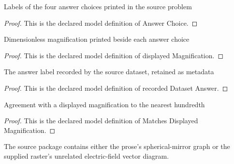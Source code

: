 \begin{definition}
  \label{def:physics:phyx-mini-0478:phyxminiproblems-problemphyxmini0478-answerchoice}
  Labels of the four answer choices printed in the source problem
\end{definition}
\begin{proof}
  This is the declared model definition of Answer Choice.
\end{proof}
\begin{definition}
  \label{def:physics:phyx-mini-0478:phyxminiproblems-problemphyxmini0478-displayedmagnification}
  Dimensionless magnification printed beside each answer choice
\end{definition}
\begin{proof}
  This is the declared model definition of displayed Magnification.
\end{proof}
\begin{definition}
  \label{def:physics:phyx-mini-0478:phyxminiproblems-problemphyxmini0478-recordeddatasetanswer}
  The answer label recorded by the source dataset, retained as metadata
\end{definition}
\begin{proof}
  This is the declared model definition of recorded Dataset Answer.
\end{proof}
\begin{definition}
  \label{def:physics:phyx-mini-0478:phyxminiproblems-problemphyxmini0478-matchesdisplayedmagnification}
  Agreement with a displayed magnification to the nearest hundredth
\end{definition}
\begin{proof}
  This is the declared model definition of Matches Displayed Magnification.
\end{proof}
\begin{definition}
  \label{def:physics:phyx-mini-0478:phyxminiproblems-problemphyxmini0478-sourcescene}
  The source package contains either the prose's spherical-mirror graph or the supplied raster's unrelated electric-field vector diagram.
\end{definition}
